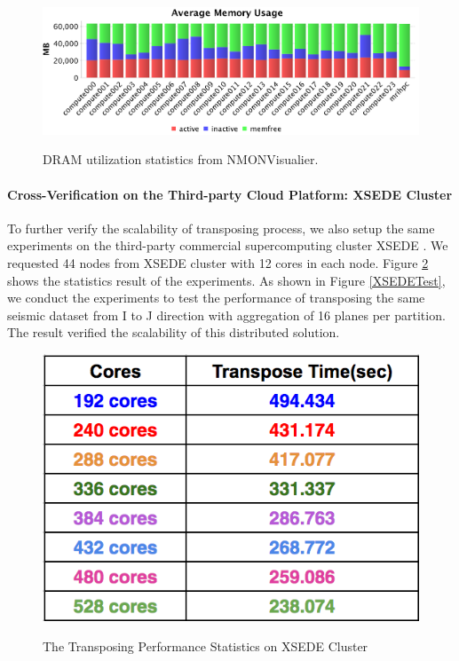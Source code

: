 \begin{figure}[h]
\centering
\includegraphics[scale=0.6]{figures/NMONMemory.png}\\
\caption{DRAM utilization statistics from NMONVisualier.}\label{NMONMEM}
\end{figure}

\paragraph{Cross-Verification on the Third-party Cloud Platform: XSEDE Cluster}

To further verify the scalability of transposing process, we also setup the same experiments on the third-party  commercial supercomputing cluster XSEDE \cite{XSEDE}. We requested 44 nodes from XSEDE cluster with 12 cores in each node. Figure \ref{XSEDETestStat} shows the statistics result of the experiments. As shown in Figure \ref{XSEDETest}, we conduct the experiments to test the performance of transposing the same seismic dataset from I to J direction with aggregation of 16 planes per partition. The result verified the scalability of this distributed solution.

\begin{figure}[h]
\centering
\includegraphics[scale=0.6]{figures/XSEDETestStat.png}\\
\caption{The Transposing Performance Statistics on XSEDE Cluster}\label{XSEDETestStat}
\end{figure}

